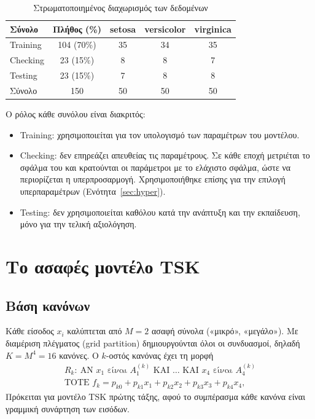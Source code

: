 \documentclass[conference]{IEEEtran}
\begin{document}
\begin{table}[!t]
\centering
\caption{Στρωματοποιημένος διαχωρισμός των δεδομένων}
\label{tab:split}
\begin{tabular}{lcccc}
\toprule
Σύνολο & Πλήθος (\%) & setosa & versicolor & virginica \\
\midrule
Training & 104 (70\%) & 35 & 34 & 35 \\
Checking &  23 (15\%) &  8 &  8 &  7 \\
Testing  &  23 (15\%) &  7 &  8 &  8 \\
\midrule
Σύνολο   & 150        & 50 & 50 & 50 \\
\bottomrule
\end{tabular}
\end{table}

Ο ρόλος κάθε συνόλου είναι διακριτός:
\begin{itemize}
\item Training: χρησιμοποιείται για τον υπολογισμό των παραμέτρων του μοντέλου.
\item Checking: δεν επηρεάζει απευθείας τις παραμέτρους. Σε κάθε εποχή
μετριέται το σφάλμα του και κρατούνται οι παράμετροι με το ελάχιστο σφάλμα,
ώστε να περιορίζεται η υπερπροσαρμογή. Χρησιμοποιήθηκε επίσης για την επιλογή
υπερπαραμέτρων (Ενότητα~\ref{sec:hyper}).
\item Testing: δεν χρησιμοποιείται καθόλου κατά την ανάπτυξη και την εκπαίδευση,
μόνο για την τελική αξιολόγηση.
\end{itemize}

\section{Το ασαφές μοντέλο TSK}

\subsection{Βάση κανόνων}
Κάθε είσοδος $x_i$ καλύπτεται από $M=2$ ασαφή σύνολα («μικρό», «μεγάλο»). Με
διαμέριση πλέγματος (grid partition) δημιουργούνται όλοι οι συνδυασμοί, δηλαδή
$K=M^4=16$ κανόνες. Ο $k$-οστός κανόνας έχει τη μορφή
\begin{multline}
R_k:\ \text{ΑΝ } x_1 \text{ είναι } A_{1}^{(k)} \text{ ΚΑΙ } \ldots \text{ ΚΑΙ }
x_4 \text{ είναι } A_{4}^{(k)} \\
\text{ΤΟΤΕ } f_k = p_{k0} + p_{k1}x_1 + p_{k2}x_2 + p_{k3}x_3 + p_{k4}x_4 ,
\label{eq:rule}
\end{multline}
Πρόκειται για μοντέλο TSK πρώτης τάξης, αφού το συμπέρασμα κάθε κανόνα είναι
γραμμική συνάρτηση των εισόδων.
\end{document}
